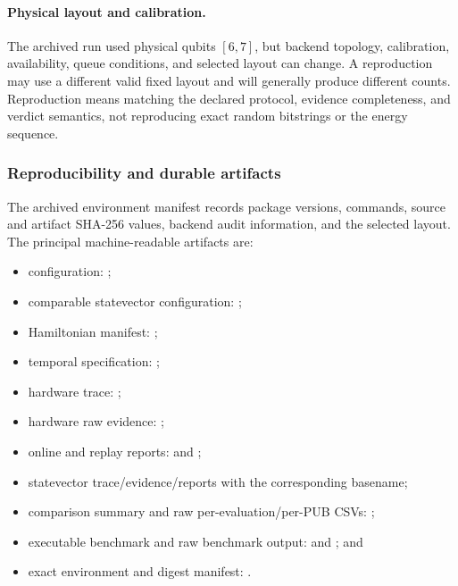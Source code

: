 \paragraph{Physical layout and calibration.}
The archived run used physical qubits $[6,7]$, but backend topology,
calibration, availability, queue conditions, and selected layout can change.
A reproduction may use a different valid fixed layout and will generally
produce different counts.  Reproduction means matching the declared protocol,
evidence completeness, and verdict semantics, not reproducing exact random
bitstrings or the energy sequence.

\subsubsection{Reproducibility and durable artifacts}

The archived environment manifest records package versions, commands, source
and artifact SHA-256 values, backend audit information, and the selected
layout.  The principal machine-readable artifacts are:

\begin{itemize}
  \item configuration: ;
  \item comparable statevector configuration:
        ;
  \item Hamiltonian manifest: ;
  \item temporal specification: ;
  \item hardware trace:
        ;
  \item hardware raw evidence:
        ;
  \item online and replay reports:
        and
        ;
  \item statevector trace/evidence/reports with the corresponding
         basename;
  \item comparison summary and raw per-evaluation/per-PUB CSVs:
        ;
  \item executable benchmark and raw benchmark output:
         and
        ; and
  \item exact environment and digest manifest:
        .
\end{itemize}


